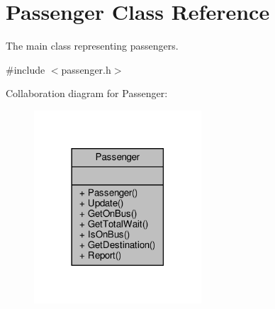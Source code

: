 \hypertarget{classPassenger}{}\section{Passenger Class Reference}
\label{classPassenger}


The main class representing passengers.  




{\ttfamily \#include $<$passenger.\+h$>$}



Collaboration diagram for Passenger\+:\nopagebreak
\begin{figure}[H]
\begin{center}
\leavevmode
\includegraphics[width=177pt]{classPassenger__coll__graph}
\end{center}
\end{figure}
